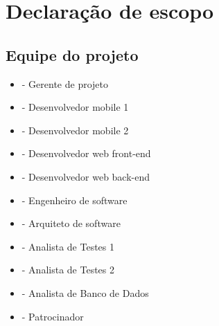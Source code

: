
\chapter{Declaração de escopo}

\section{Equipe do projeto}

\begin{itemize}
	\item \projectManagerName{} - Gerente de projeto
	\item \mobDevOneName{} - Desenvolvedor mobile 1
	\item \mobDevTwoName{} - Desenvolvedor mobile 2
	\item \frontWebDevName{} - Desenvolvedor web front-end
	\item \backWebDevName{} - Desenvolvedor web back-end
	\item \softEngName{} - Engenheiro de software
	\item \softArcName{} - Arquiteto de software
	\item \testAnalOneName{} - Analista de Testes 1
	\item \testAnalTwoName{} - Analista de Testes 2
	\item \dbAnalName{} - Analista de Banco de Dados
	\item \projectSponsorName{} - Patrocinador
\end{itemize}


